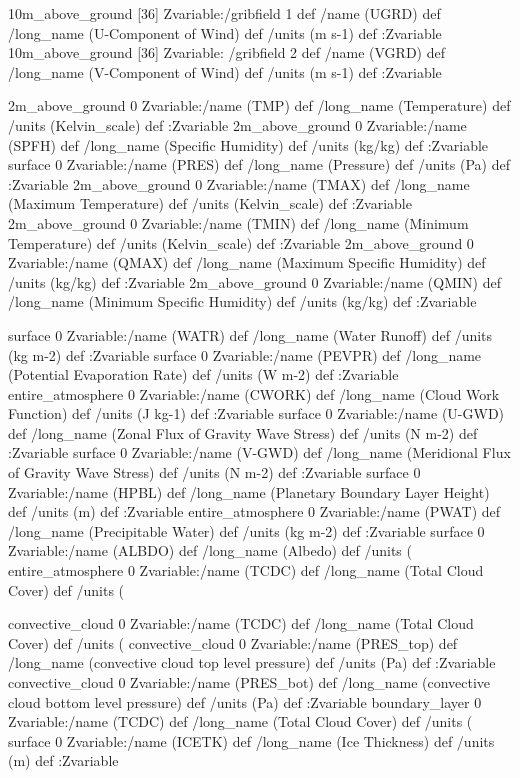 \begin{ingrid}

10m_above_ground [36] Zvariable:/gribfield 1 def /name (UGRD) def /long_name (U-Component of Wind) def /units (m s-1) def :Zvariable 
10m_above_ground [36] Zvariable: /gribfield 2 def /name (VGRD) def /long_name (V-Component of Wind) def /units (m s-1) def  :Zvariable

2m_above_ground 0 Zvariable:/name (TMP) def /long_name (Temperature) def /units (Kelvin_scale) def :Zvariable
2m_above_ground 0 Zvariable:/name (SPFH) def /long_name (Specific Humidity) def /units (kg/kg) def :Zvariable
surface 0 Zvariable:/name (PRES) def /long_name (Pressure) def /units (Pa) def :Zvariable
2m_above_ground 0 Zvariable:/name (TMAX) def /long_name (Maximum Temperature) def /units (Kelvin_scale) def :Zvariable
2m_above_ground 0 Zvariable:/name (TMIN) def /long_name (Minimum Temperature) def /units (Kelvin_scale) def :Zvariable
2m_above_ground 0 Zvariable:/name (QMAX) def /long_name (Maximum Specific Humidity) def /units (kg/kg) def :Zvariable
2m_above_ground 0 Zvariable:/name (QMIN) def /long_name (Minimum Specific Humidity) def /units (kg/kg) def :Zvariable

\end{ingrid}
\begin{ingrid}

surface 0 Zvariable:/name (WATR) def /long_name (Water Runoff) def /units (kg m-2) def :Zvariable
surface 0 Zvariable:/name (PEVPR) def /long_name (Potential Evaporation Rate) def /units (W m-2) def :Zvariable
entire_atmosphere 0 Zvariable:/name (CWORK) def /long_name (Cloud Work Function) def /units (J kg-1) def :Zvariable
surface 0 Zvariable:/name (U-GWD) def /long_name (Zonal Flux of Gravity Wave Stress) def /units (N m-2) def :Zvariable
surface 0 Zvariable:/name (V-GWD) def /long_name (Meridional Flux of Gravity Wave Stress) def /units (N m-2) def :Zvariable
surface 0 Zvariable:/name (HPBL) def /long_name (Planetary Boundary Layer Height) def /units (m) def :Zvariable
entire_atmosphere 0 Zvariable:/name (PWAT) def /long_name (Precipitable Water) def /units (kg m-2) def :Zvariable
surface 0 Zvariable:/name (ALBDO) def /long_name (Albedo) def /units (%
entire_atmosphere 0 Zvariable:/name (TCDC) def /long_name (Total Cloud Cover) def /units (%

\end{ingrid}
\begin{ingrid}

convective_cloud 0 Zvariable:/name (TCDC) def /long_name (Total Cloud Cover) def /units (%
convective_cloud 0 Zvariable:/name (PRES_top) def /long_name (convective cloud top level pressure) def /units (Pa) def :Zvariable
convective_cloud 0 Zvariable:/name (PRES_bot) def /long_name (convective cloud bottom level pressure) def /units (Pa) def :Zvariable
boundary_layer 0 Zvariable:/name (TCDC) def /long_name (Total Cloud Cover) def /units (%
surface 0 Zvariable:/name (ICETK) def /long_name (Ice Thickness) def /units (m) def :Zvariable

\end{ingrid}
